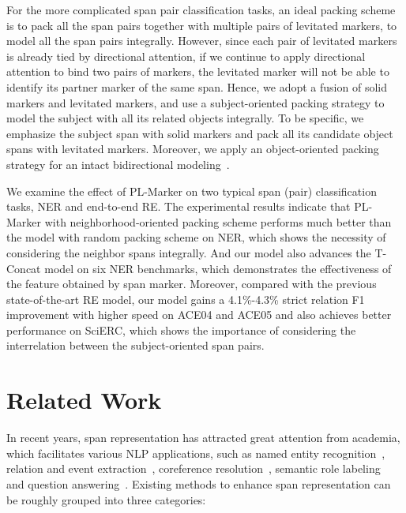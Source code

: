 \documentclass[11pt]{article}
\newcommand\Ourmodel{PL-Marker\xspace}
\begin{document}
For the more complicated span pair classification tasks, an ideal packing scheme is to pack all the span pairs together with multiple pairs of levitated markers, to model all the span pairs integrally. 
However, since each pair of levitated markers is already tied by  directional attention,  if we continue to apply directional attention to bind two pairs of markers,  the levitated marker will not be able to identify its partner marker of the same span. 
Hence, we adopt a fusion of solid markers and levitated markers, and use a subject-oriented packing strategy to model the subject with all its related objects integrally.  To be specific,  we emphasize the subject span with solid markers and  pack all its candidate object spans with  levitated markers. Moreover, we apply an object-oriented packing strategy for an intact bidirectional modeling~\cite{corefqa}. 



We examine the effect of \Ourmodel on two typical span (pair) classification tasks, NER and end-to-end RE. The experimental results indicate that \Ourmodel with neighborhood-oriented packing scheme performs much better than the model with random packing scheme on NER, which shows the necessity of considering the neighbor spans integrally. And our model  also advances  the T-Concat model on six NER benchmarks, which demonstrates the effectiveness of the feature obtained by span marker. 
Moreover, compared with the previous state-of-the-art RE model, our  model gains  a 4.1\%-4.3\% strict relation F1 improvement with higher speed  on ACE04 and ACE05  and also achieves better performance on SciERC, which shows the importance of considering the interrelation between the subject-oriented span pairs.








\section{Related Work}

In recent years, span representation has attracted great attention from academia, which facilitates  various NLP applications, such as named entity recognition~\cite{instancener}, relation and event extraction~\cite{DyGIE}, coreference  resolution~\cite{e2ecoref}, semantic role labeling~\cite{SRL} and question answering~\cite{qaspan}. Existing methods to enhance span  representation  can be roughly grouped  into three categories: 
\end{document}
